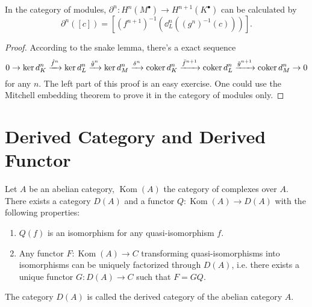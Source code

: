 In the category of modules, $\partial^n:H^n(M^\bullet)\to H^{n+1}(K^\bullet)$ can be calculated by
\[
	\partial^n([c])=\left[(f^{n+1})^{-1}\left(\dd^n_L\left((g^n)^{-1}(c)\right)\right)\right].
\]

\begin{proof}
	According to the snake lemma, there's a exact sequence
	\[
		0\to \ker d_K^n\xrightarrow{\hat f^n} \ker d_L^n
		\xrightarrow{\hat g^n}
		\ker d_M^n \xrightarrow{\delta^n}
		\operatorname{coker} d_K^n\xrightarrow{\bar f^{n+1}} \operatorname{coker} d_L^n\xrightarrow{\bar g^{n+1}} \operatorname{coker} d_M^n \to 0
	\]
	for any $n$. The left part of this proof is an easy exercise.
	One could use the Mitchell embedding theorem to prove it in the category
	of modules only.
\end{proof}



\section{Derived Category and Derived Functor}

\begin{definition}
	Let $A$ be an abelian category, $\operatorname{Kom}(A)$ the 
	category of complexes over $A$. There exists a category 
	$D(A)$ and a functor $Q:\operatorname{Kom}(A)\to D(A)$
	with the following properties:
	\begin{enumerate}
		\item $Q(f)$ is an isomorphism for any quasi-isomorphism $f$.
		\item Any functor $F:\operatorname{Kom}(A)\to C$ transforming
			quasi-isomorphisms into isomorphisms can be uniquely
			factorized through $D(A)$, i.e. there exists a unique 
			functor $G:D(A)\to C$ such that $F=GQ$.
	\end{enumerate}
	The category $D(A)$ is called the derived category of the abelian
	category $A$.
\end{definition}

